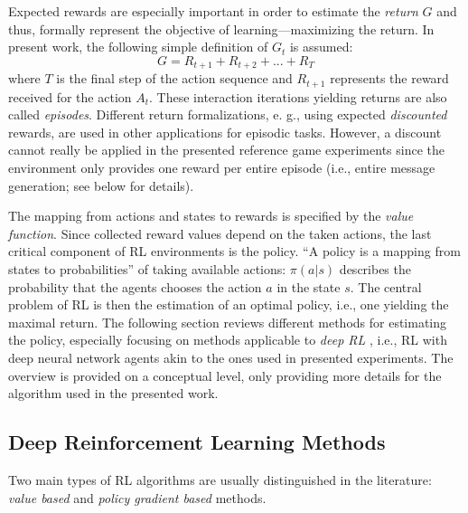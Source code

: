 Expected rewards are especially important in order to estimate the \textit{return} $G$ and thus, formally represent the objective of learning---maximizing the return. In present work, the following simple definition of $G_t$ is assumed: 
\begin{equation}
G = R_{t+1} + R_{t+2} + ... + R_T
\end{equation}
where $T$ is the final step of the action sequence and $R_{t+1}$ represents the reward received for the action $A_t$. These interaction iterations yielding returns are also called \textit{episodes}. Different return formalizations, e. g., using expected \textit{discounted} rewards, are used in other applications for episodic tasks. However, a discount cannot really be applied in the presented reference game experiments since the environment only provides one reward per entire episode (i.e., entire message generation; see below for details).

The mapping from actions and states to rewards is specified by the \textit{value function}. Since collected reward values depend on the taken actions, the last critical component of RL environments is the policy. ``A policy is a mapping from states to probabilities'' of taking available actions: $\pi(a | s)$ describes the probability that the agents chooses the action $a$ in the state $s$. The central problem of RL is then the estimation of an optimal policy, i.e., one yielding the maximal return. The following section reviews different methods for estimating the policy, especially focusing on methods applicable to \textit{deep RL} \parencite{lecun2015deep}, i.e., RL with deep neural network agents akin to the ones used in presented experiments. The overview is provided on a conceptual level, only providing more details for the algorithm used in the presented work.

\subsection{Deep Reinforcement Learning Methods}
\label{rl_methods}
Two main types of RL algorithms are usually distinguished in the literature: \textit{value based} and \textit{policy gradient based} methods. 

